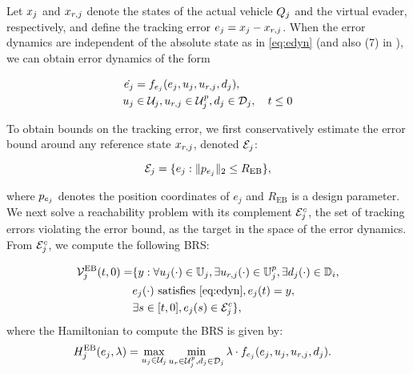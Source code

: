 Let $x_j$ and $x_{r,j}$ denote the states of the actual vehicle $Q_j$ and the virtual evader, respectively, and define the tracking error $e_j=x_j-x_{r,j}$. When the error dynamics are independent of the absolute state as in \eqref{eq:edyn} (and also (7) in \cite{Mitchell05}), we can obtain error dynamics of the form

\begin{equation}
\label{eq:edyn} %
\begin{aligned}
\dot{e_j} &= \fdyn_{e_j}(e_j, \ctrl_j, \ctrl_{r,j},\dstb_j), \\
\ctrl_j &\in \cset_j, \ctrl_{r,j} \in \cset^p_j, \dstb_j \in \dset_j, \quad t \leq 0
\end{aligned}
\end{equation}

To obtain bounds on the tracking error, we first conservatively estimate the error bound around any reference state $x_{r,j}$, denoted $\mathcal{E}_j$:

\begin{equation} \label{eqn:err}
\mathcal{E}_j = \{e_j: \|p_{e_j}\|_2 \le R_{\text{EB}} \}, 
\end{equation}

\noindent where $p_{e_j}$ denotes the position coordinates of $e_j$ and $R_{\text{EB}}$ is a design parameter. We next solve a reachability problem with its complement $\mathcal{E}_j^c$, the set of tracking errors violating the error bound, as the target in the space of the error dynamics. From $\mathcal{E}_j^c$, we compute the following BRS:

\begin{equation} \label{eqn:errBound}
\begin{aligned}
\mathcal{V}^{\text{EB}}_{j}(t, 0) = & \{y: \forall u_j(\cdot) \in \mathbb{U}_j, \exists u_{r, j}(\cdot) \in \mathbb{U}^p_j, \exists d_j(\cdot) \in \mathbb{D}_i, \\
& e_j(\cdot) \text{ satisfies \eqref{eq:edyn}}, e_j(t) = y, \\
& \exists s \in [t, 0], e_j(s) \in \mathcal{E}_j^c\}, 
\end{aligned}
\end{equation}
where the Hamiltonian to compute the BRS is given by:
\begin{equation}
\begin{aligned}
H^{\text{EB}}_{j}(e_j, \lambda) &= \max_{u_j \in \mathcal{U}_j} \min_{u_r \in \mathcal{U}^p_j, d_j \in \mathcal{D}_j} \lambda \cdot f_{e_j}(e_j, u_j, u_{r,j}, d_j).
\end{aligned}
\end{equation}

